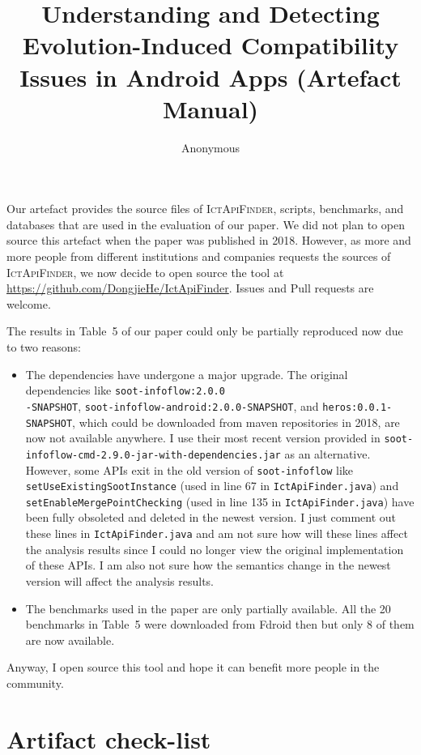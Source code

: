 \documentclass[11pt]{article}
\title{Understanding and Detecting Evolution-Induced Compatibility Issues in Android Apps (Artefact Manual)
}
\author{Anonymous}
\begin{document}
\maketitle

Our artefact provides the source files of \textsc{IctApiFinder}, scripts,  benchmarks, and databases that are used in the evaluation of our paper. We did not plan to open source this artefact when the paper was published in 2018. However, as more and more people from different institutions and companies requests the sources of \textsc{IctApiFinder}, we now decide to open source the tool at \url{https://github.com/DongjieHe/IctApiFinder}. Issues and Pull requests are welcome.

The results in Table~5 of our paper could only be partially reproduced now due to two reasons:
\begin{itemize}
	\item The dependencies have undergone a major upgrade. The original dependencies like \texttt{soot-infoflow:2.0.0\\-SNAPSHOT}, \texttt{soot-infoflow-android:2.0.0-SNAPSHOT}, and \texttt{heros:0.0.1-SNAPSHOT}, which could be downloaded from maven repositories in 2018, are now not available anywhere. I use their most recent
	version provided in \texttt{soot-infoflow-cmd-2.9.0-jar-with-dependencies.jar} as an alternative.
	However, some APIs exit in the old version of \texttt{soot-infoflow} like \texttt{setUseExistingSootInstance} (used in line 67 in \texttt{IctApiFinder.java}) and \texttt{setEnableMergePointChecking} (used in line 135 in \texttt{IctApiFinder.java}) have been fully obsoleted and deleted in the newest version. I just comment out these lines in \texttt{IctApiFinder.java} and am not sure how will these lines affect the analysis results since I could no longer view the original implementation of these APIs. I am also not sure how the semantics change in the newest version will affect the analysis results.
	\item The benchmarks used in the paper are only partially available. All the 20 benchmarks in Table~5 were downloaded from Fdroid then but only 8 of them are now available. 
\end{itemize}

Anyway, I open source this tool and hope it can benefit more people in the community. 

\section{Artifact check-list}
\end{document}
